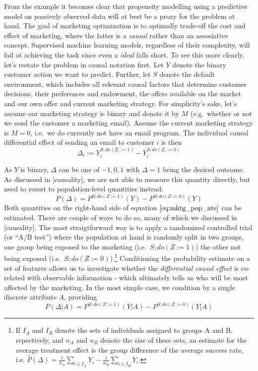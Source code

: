 \documentclass[
]{book}
\theoremstyle{definition}
\theoremstyle{definition}
\theoremstyle{definition}
\theoremstyle{remark}
\begin{document}
From the example it becomes clear that propensity modelling using a predictive model on passively observed data will at best be a proxy for the problem at hand. The goal of marketing optimization is to optimally trade-off the cost and effect of marketing, where the latter is a \emph{causal} rather than an assosiative concept. Supervised machine learning models, regardless of their complexity, will fail at achieving the task since even a \emph{ideal} falls short.
To see this more clearly, let's restate the problem in causal notation first. Let \(Y\) denote the binary customer action we want to predict. Further, let \(S\) denote the default environment, which includes all relevant causal factors that determine customer decisions, their preferences and endowment, the offers available on the market and our own offer and current marketing strategy. For simplicity's sake, let's assume our marketing strategy is binary and denote it by \(M\) (e.g.~whether or not we send the customer a marketing email). Assume the current marketing strategy is \(M = 0\), i.e.~we do currently not have an email program.
The individual causal differential effect of sending an email to customer \(i\) is then
\begin{equation}
\Delta_i := Y_i^{S;do(Z_i:=1)} - Y_i^{S; do(Z_i:=0)} \label{eq:myfirsteq} \tag{1}
\end{equation}

As \(Y\) is binary, \(\Delta\) can be one of \({-1, 0, 1}\) with \(\Delta = 1\) being the desired outcome. As discussed in {[}causality{]}, we are not able to measure this quantity directly, but need to resort to population-level quantities instead:
\begin{equation}
P(\Delta) = P^{S;do(Z:=1)}(Y) - P^{S;do(Z:=0)}(Y) \label{eq:mktg_pop_ate} \tag{2}
\end{equation}
Both quantities on the right-hand side of equation \(\eqref{eq:mktg_pop_ate}\) can be estimated. There are couple of ways to do so, many of which we discussed in {[}causality{]}. The most straigtforward way is to apply a randomized controlled trial (or ``A/B test'') where the population at hand is randomly split in two groups, one group being exposed to the marketing (i.e.~\(S;do(Z:=1)\)) the other not being exposed (i.e.~\(S;do(Z:=0)\)).\footnote{If $I_A$ and $I_B$ denote the sets of individuals assigned to groups A and B, repectively, and $n_A$ and $n_B$ denote the size of these sets, an estimate for the average treatment effect is the group difference of the average success rate, i.e. $\hat{P}(\Delta) = \frac{1}{n_A} \sum_{i \in I_A} Y_i - \frac{1}{n_B} \sum_{i \in I_B} Y_i$.}
Conditioning the probability estimate on a set of features allows us to investigate whether the \emph{differential causal effect} is co-related with observable information - which ultimately tells us who will be most affected by the marketing.
In the most simple case, we condition by a single discrete attribute \(A\), providing
\begin{equation}
P(\Delta | A) = P^{S;do(Z:=1)}(Y | A) - P^{S;do(Z:=0)}(Y | A) \label{eq:mktg_pop_cate} \tag{3}
\end{equation}
\end{document}
